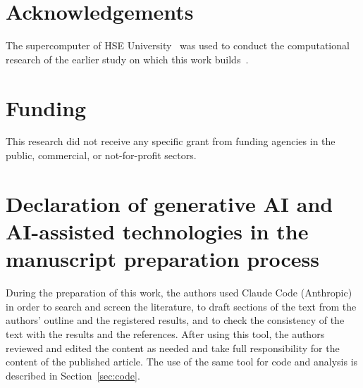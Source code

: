 \documentclass[preprint,12pt]{elsarticle}
\begin{document}
\section*{Acknowledgements}
The supercomputer of HSE University~\cite{kostenetskiy2026high} was used to conduct the computational research of the
earlier study on which this work builds~\cite{avdoshin2026discrete}.

\section*{Funding}
This research did not receive any specific grant from funding agencies in the public, commercial, or not-for-profit
sectors.

\section*{Declaration of generative AI and AI-assisted technologies in the manuscript preparation process}
During the preparation of this work, the authors used Claude Code (Anthropic) in order to search and screen the
literature, to draft sections of the text from the authors' outline and the registered results, and to check the
consistency of the text with the results and the references. After using this tool, the authors reviewed and edited
the content as needed and take full responsibility for the content of the published article. The use of the same tool
for code and analysis is described in Section~\ref{sec:code}. %



\end{document}
